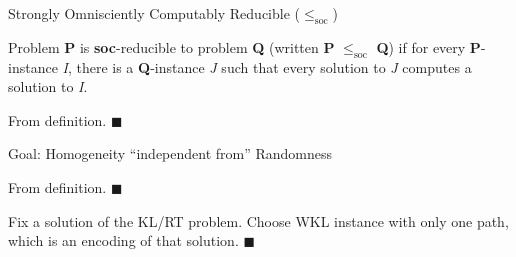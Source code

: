 \begin{frame}{Strongly Omnisciently Computably Reducible
($\leq_{\text{soc}}$)}
  \begin{define*}
    Problem \textbf{P} is \textbf{soc}-reducible to problem \textbf{Q}
    (written \textbf{P} $\leq_{\text{soc}}$ \textbf{Q}) if for every
    \textbf{P}-instance \textit{I}, there is a \textbf{Q}-instance
    \textit{J} such that every solution to \textit{J} computes a solution
    to \textit{I}.
  \end{define*}

  \begin{observe*}
    From definition. $\blacksquare$
  \end{observe*}

  \begin{center}
  \end{center}
\end{frame}

\begin{frame}{Goal: Homogeneity ``independent from'' Randomness}
  \begin{observe*}
    From definition. $\blacksquare$
  \end{observe*}

  \begin{observe*}
    Fix a solution of the KL/RT problem. Choose WKL instance with only
    one path, which is an encoding of that solution. $\blacksquare$
  \end{observe*}

  \begin{center}
  \end{center}
\end{frame}
